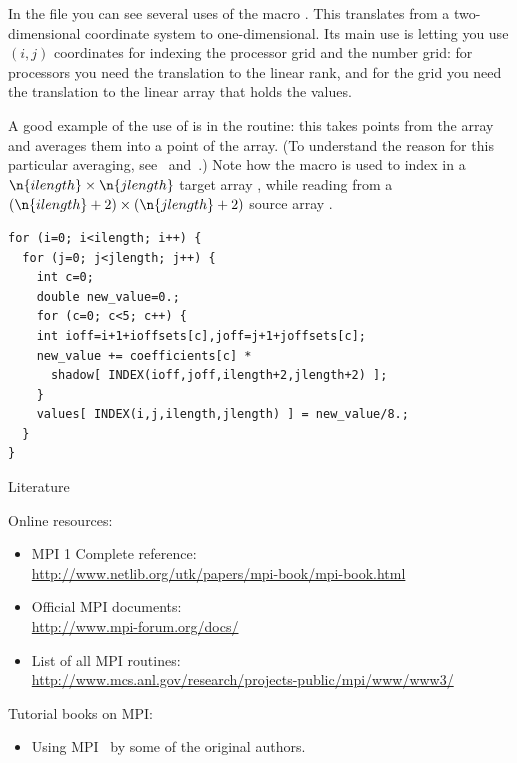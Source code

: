 In the file  you can see several uses of
the macro . This translates from a two-dimensional coordinate
system to one-dimensional. Its main use is letting you use $(i,j)$
coordinates for indexing the processor grid and the number grid: for
processors you need the translation to the linear rank, and for the
grid you need the translation to the linear array that holds the
values.

A good example of the use of  is in the
 routine: this takes points from the 
array and averages them into a point of the  array. (To
understand the reason for this particular averaging,
see~ and~.) Note how the
 macro is used to index in a
$\n{ilength}\times\n{jlength}$ target array , while
reading from a $(\n{ilength}+2)\times(\n{jlength}+2)$ source array
.
\begin{verbatim}
for (i=0; i<ilength; i++) {
  for (j=0; j<jlength; j++) {
    int c=0;
    double new_value=0.;
    for (c=0; c<5; c++) {
	int ioff=i+1+ioffsets[c],joff=j+1+joffsets[c];
	new_value += coefficients[c] * 
	  shadow[ INDEX(ioff,joff,ilength+2,jlength+2) ];
    }
    values[ INDEX(i,j,ilength,jlength) ] = new_value/8.;
  }
}
\end{verbatim}

 {Literature}

Online resources:
\begin{itemize}
\item MPI 1 Complete reference:\\ \url{http://www.netlib.org/utk/papers/mpi-book/mpi-book.html}
\item Official MPI documents:\\ \url{http://www.mpi-forum.org/docs/}
\item List of all MPI routines:\\ \url{http://www.mcs.anl.gov/research/projects-public/mpi/www/www3/}
\end{itemize}

Tutorial books on MPI:
\begin{itemize}
\item Using MPI~\cite{Gropp:UsingMPI1} by some of the original authors.
\end{itemize}

\endinput

Examples: 
compute pi
mandelbrot set
